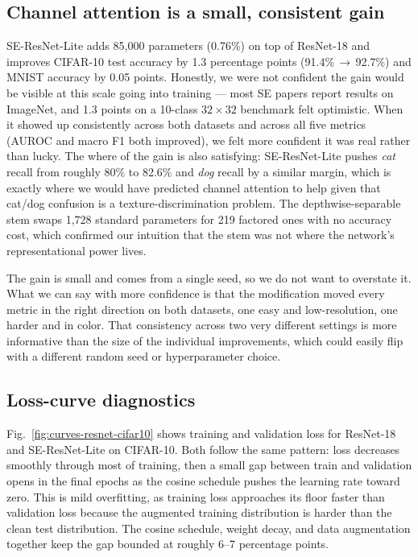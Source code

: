 \documentclass[conference,10pt]{IEEEtran}
\begin{document}
\subsection{Channel attention is a small, consistent gain}

SE-ResNet-Lite adds 85{,}000 parameters (0.76\%) on top of ResNet-18
and improves CIFAR-10 test accuracy by 1.3 percentage points
(91.4\%\,$\to$\,92.7\%) and MNIST accuracy by 0.05 points. Honestly,
we were not confident the gain would be visible at this scale going
into training --- most SE papers report results on ImageNet, and 1.3
points on a 10-class $32\!\times\!32$ benchmark felt optimistic. When
it showed up consistently across both datasets and across all five
metrics (AUROC and macro F1 both improved), we felt more confident it
was real rather than lucky. The where of the gain is also satisfying:
SE-ResNet-Lite pushes \emph{cat} recall from roughly 80\% to 82.6\%
and \emph{dog} recall by a similar margin, which is exactly where we
would have predicted channel attention to help given that cat/dog
confusion is a texture-discrimination problem. The depthwise-separable
stem swaps 1{,}728 standard parameters for 219 factored ones with no
accuracy cost, which confirmed our intuition that the stem was not
where the network's representational power lives.

The gain is small and comes from a single seed, so we do not want to
overstate it. What we can say with more confidence is that the
modification moved every metric in the right direction on both
datasets, one easy and low-resolution, one harder and in color.
That consistency across two very different settings is more informative
than the size of the individual improvements, which could easily flip
with a different random seed or hyperparameter choice.

\subsection{Loss-curve diagnostics}

Fig.~\ref{fig:curves-resnet-cifar10} shows training and validation
loss for ResNet-18 and SE-ResNet-Lite on CIFAR-10. Both follow the
same pattern: loss decreases smoothly through most of training, then
a small gap between train and validation opens in the final epochs
as the cosine schedule pushes the learning rate toward zero. This
is mild overfitting, as training loss approaches its floor faster than
validation loss because the augmented training distribution is harder
than the clean test distribution. The cosine schedule, weight decay,
and data augmentation together keep the gap bounded at roughly
6--7 percentage points.
\end{document}
